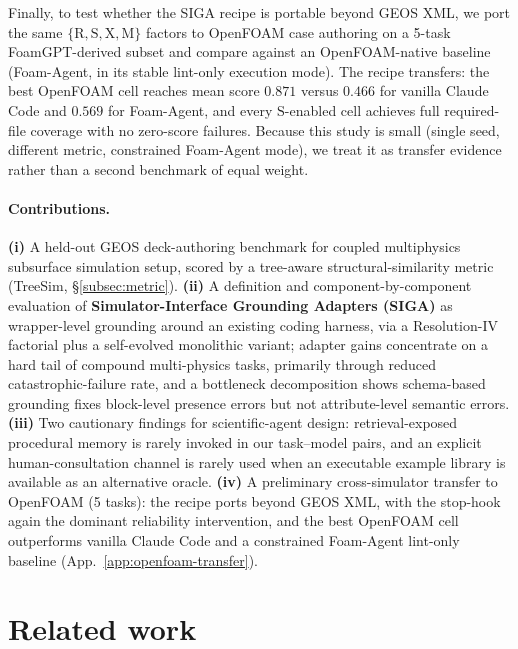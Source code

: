 \documentclass{article}
\begin{document}
Finally, to test whether the SIGA recipe is portable beyond GEOS XML, we port the same $\{\mathrm{R,S,X,M}\}$ factors to OpenFOAM case authoring on a 5-task FoamGPT-derived subset and compare against an OpenFOAM-native baseline (Foam-Agent, in its stable lint-only execution mode). The recipe transfers: the best OpenFOAM cell reaches mean score $0.871$ versus $0.466$ for vanilla Claude Code and $0.569$ for Foam-Agent, and every $\mathrm{S}$-enabled cell achieves full required-file coverage with no zero-score failures. Because this study is small (single seed, different metric, constrained Foam-Agent mode), we treat it as transfer evidence rather than a second benchmark of equal weight.

\paragraph{Contributions.}
\textbf{(i)} A held-out GEOS deck-authoring benchmark for coupled multiphysics subsurface simulation setup, scored by a tree-aware structural-similarity metric (TreeSim, \S\ref{subsec:metric}).
\textbf{(ii)} A definition and component-by-component evaluation of \textbf{Simulator-Interface Grounding Adapters (SIGA)} as wrapper-level grounding around an existing coding harness, via a Resolution-IV factorial plus a self-evolved monolithic variant; adapter gains concentrate on a hard tail of compound multi-physics tasks, primarily through reduced catastrophic-failure rate, and a bottleneck decomposition shows schema-based grounding fixes block-level presence errors but not attribute-level semantic errors.
\textbf{(iii)} Two cautionary findings for scientific-agent design: retrieval-exposed procedural memory is rarely invoked in our task--model pairs, and an explicit human-consultation channel is rarely used when an executable example library is available as an alternative oracle.
\textbf{(iv)} A preliminary cross-simulator transfer to OpenFOAM (5 tasks): the recipe ports beyond GEOS XML, with the stop-hook again the dominant reliability intervention, and the best OpenFOAM cell outperforms vanilla Claude Code and a constrained Foam-Agent lint-only baseline (App.~\ref{app:openfoam-transfer}).

\section{Related work}
\label{sec:related}
\end{document}
